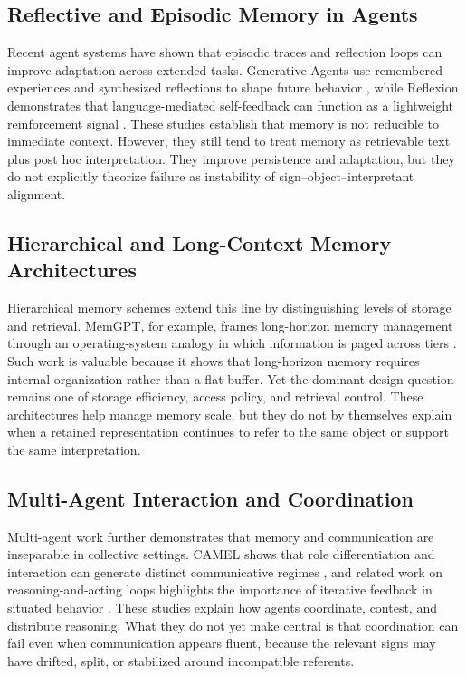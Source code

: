 \documentclass[10pt,twocolumn]{article}
\begin{document}
\subsection{Reflective and Episodic Memory in Agents}

Recent agent systems have shown that episodic traces and reflection loops can improve adaptation across extended tasks. Generative Agents use remembered experiences and synthesized reflections to shape future behavior \cite{park2023generative}, while Reflexion demonstrates that language-mediated self-feedback can function as a lightweight reinforcement signal \cite{shinn2023reflexion}. These studies establish that memory is not reducible to immediate context. However, they still tend to treat memory as retrievable text plus post hoc interpretation. They improve persistence and adaptation, but they do not explicitly theorize failure as instability of sign--object--interpretant alignment.

\subsection{Hierarchical and Long-Context Memory Architectures}

Hierarchical memory schemes extend this line by distinguishing levels of storage and retrieval. MemGPT, for example, frames long-horizon memory management through an operating-system analogy in which information is paged across tiers \cite{packer2024memgpt}. Such work is valuable because it shows that long-horizon memory requires internal organization rather than a flat buffer. Yet the dominant design question remains one of storage efficiency, access policy, and retrieval control. These architectures help manage memory scale, but they do not by themselves explain when a retained representation continues to refer to the same object or support the same interpretation.

\subsection{Multi-Agent Interaction and Coordination}

Multi-agent work further demonstrates that memory and communication are inseparable in collective settings. CAMEL shows that role differentiation and interaction can generate distinct communicative regimes \cite{li2023camel}, and related work on reasoning-and-acting loops highlights the importance of iterative feedback in situated behavior \cite{yao2023react}. These studies explain how agents coordinate, contest, and distribute reasoning. What they do not yet make central is that coordination can fail even when communication appears fluent, because the relevant signs may have drifted, split, or stabilized around incompatible referents.
\end{document}
